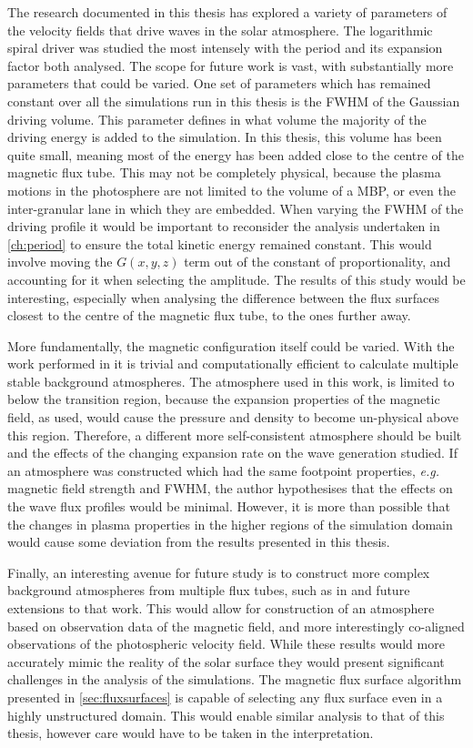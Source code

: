 \documentclass[a4paper,12pt,fourier,authoryear,custommargin]{Classes/PhDThesisPSnPDF}
\begin{document}
The research documented in this thesis has explored a variety of parameters of the velocity fields that drive waves in the solar atmosphere.
The logarithmic spiral driver was studied the most intensely with the period and its expansion factor both analysed.
The scope for future work is vast, with substantially more parameters that could be varied.
One set of parameters which has remained constant over all the simulations run in this thesis is the FWHM of the Gaussian driving volume.
This parameter defines in what volume the majority  of the driving energy is added to the simulation.
In this thesis, this volume has been quite small, meaning most of the energy has been added close to the centre of the magnetic flux tube.
This may not be completely physical, because the plasma motions in the photosphere are not limited to the volume of a MBP, or even the inter-granular lane in which they are embedded.
When varying the FWHM of the driving profile it would be important to reconsider the analysis undertaken in \cref{ch:period} to ensure the total kinetic energy remained constant.
This would involve moving the $G(x,y,z)$ term out of the constant of proportionality, and accounting for it when selecting the amplitude.
The results of this study would be interesting, especially when analysing the difference between the flux surfaces closest to the centre of the magnetic flux tube, to the ones further away.

More fundamentally, the magnetic configuration itself could be varied.
With the work performed in \cite{gent2013,gent2014} it is trivial and computationally efficient to calculate multiple stable background atmospheres.
The atmosphere used in this work, is limited to below the transition region, because the expansion properties of the magnetic field, as used, would cause the pressure and density to become un-physical above this region.
Therefore, a different more self-consistent atmosphere should be built and the effects of the changing expansion rate on the wave generation studied.
If an atmosphere was constructed which had the same footpoint properties, \textit{e.g.} magnetic field strength and FWHM, the author hypothesises that the effects on the wave flux profiles would be minimal.
However, it is more than possible that the changes in plasma properties in the higher regions of the simulation domain would cause some deviation from the results presented in this thesis.

Finally, an interesting avenue for future study is to construct more complex background atmospheres from multiple flux tubes, such as in \cite{gent2014} and future extensions to that work.
This would allow for construction of an atmosphere based on observation data of the magnetic field, and more interestingly co-aligned observations of the photospheric velocity field.
While these results would more accurately mimic the reality of the solar surface they would present significant challenges in the analysis of the simulations.
The magnetic flux surface algorithm presented in \cref{sec:fluxsurfaces} is capable of selecting any flux surface even in a highly unstructured domain.
This would enable similar analysis to that of this thesis, however care would have to be taken in the interpretation.
\clearpage{}%
%
\end{document}
